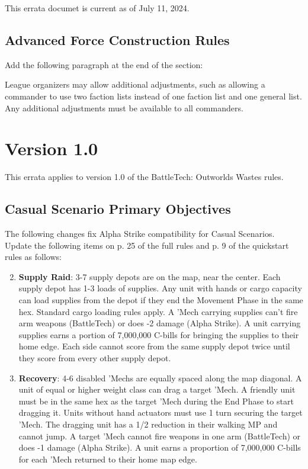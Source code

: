 This errata documet is current as of July 11, 2024.

\subsection{Advanced Force Construction Rules}

Add the following paragraph at the end of the section:

League organizers may allow additional adjustments, such as allowing a commander to use two faction lists instead of one faction list and one general list.
Any additional adjustments must be available to all commanders.

\section{Version 1.0}

This errata applies to version 1.0 of the BattleTech: Outworlds Wastes rules.

\subsection{Casual Scenario Primary Objectives}

The following changes fix Alpha Strike compatibility for Casual Scenarios.
Update the following items on p. 25 of the full rules and p. 9 of the quickstart rules  as follows:

\begin{enumerate}

\setcounter{enumi}{1}
\item {\bfseries Supply Raid}: 3-7 supply depots are on the map, near the center.
Each supply depot has 1-3 loads of supplies.
Any unit with hands or cargo capacity can load supplies from the depot if they end the Movement Phase in the same hex.
Standard cargo loading rules apply.
A 'Mech carrying supplies can't fire arm weapons (BattleTech) or does -2 damage (Alpha Strike).
A unit carrying supplies earns a portion of 7,000,000 C-bills for bringing the supplies to their home edge.
Each side cannot score from the same supply depot twice until they score from every other supply depot.

\setcounter{enumi}{7}
\item {\bfseries Recovery}: 4-6 disabled 'Mechs are equally spaced along the map diagonal.
A unit of equal or higher weight class can drag a target 'Mech.
A friendly unit must be in the same hex as the target 'Mech during the End Phase to start dragging it.
Units without hand actuators must use 1 turn securing the target 'Mech.
The dragging unit has a 1/2 reduction in their walking MP and cannot jump.
A target 'Mech cannot fire weapons in one arm (BattleTech) or does -1 damage (Alpha Strike).
A unit earns a proportion of 7,000,000 C-bills for each 'Mech returned to their home map edge.

\end{enumerate}

